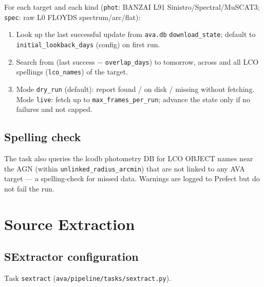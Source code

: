 \documentclass[12pt,a4paper]{article}
\begin{document}
For each target and each kind (\texttt{phot}: BANZAI L91 Sinistro/Spectral/MuSCAT3;
\texttt{spec}: raw L0 FLOYDS spectrum/arc/flat):

\begin{enumerate}
  \item Look up the last successful update from \texttt{ava.db}
        \texttt{download\_state}; default to \texttt{initial\_\hspace{0pt}lookback\_\hspace{0pt}days}
        (config) on first run.
  \item Search from (last success $-$ \texttt{overlap\_days}) to tomorrow,
        across  and all LCO spellings
        (\texttt{lco\_names}) of the target.
  \item Mode \texttt{dry\_run} (default): report found / on disk / missing
        without fetching.  Mode \texttt{live}: fetch up to
        \texttt{max\_\hspace{0pt}frames\_\hspace{0pt}per\_\hspace{0pt}run}; advance the state only if no failures
        and not capped.
\end{enumerate}

\subsection{Spelling check}

The task also queries the lcodb photometry DB for LCO OBJECT names near the
AGN (within \texttt{unlinked\_\hspace{0pt}radius\_\hspace{0pt}arcmin}) that are not linked to any AVA
target --- a spelling-check for missed data.  Warnings are logged to Prefect
but do not fail the run.

\section{Source Extraction}
\label{sec:sextractor}

\subsection{SExtractor configuration}

Task \texttt{sextract} (\texttt{ava/\hspace{0pt}pipeline/\hspace{0pt}tasks/\hspace{0pt}sextract.py}).
\end{document}

